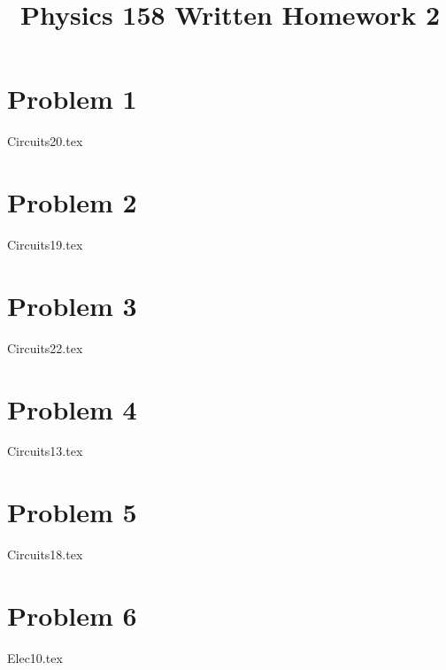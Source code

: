 \documentclass[11pt, fleqn]{article}
\title{Physics 158 Written Homework 2}
\author{}
\date{}
\begin{document}
\allowdisplaybreaks

\maketitle

\section*{Problem 1}
{Circuits20.tex}
\section*{Problem 2}
{Circuits19.tex}
\section*{Problem 3}
{Circuits22.tex}
\section*{Problem 4}
{Circuits13.tex}
\section*{Problem 5}
{Circuits18.tex}
\section*{Problem 6}
{Elec10.tex}
\end{document}
